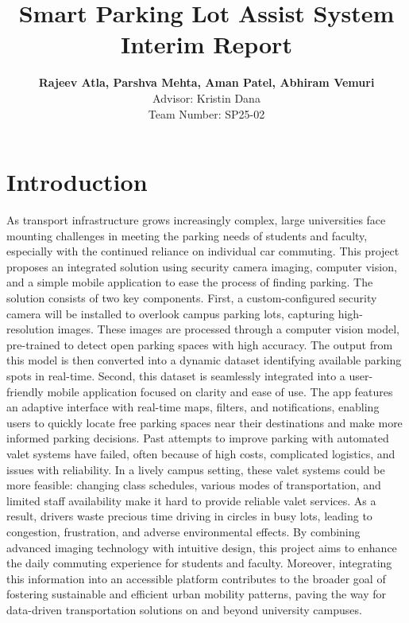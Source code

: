 \documentclass[conference]{IEEEtran}
\begin{document}
\title{Smart Parking Lot Assist System\\
{\footnotesize \textbf{Interim Report}}
}

\author{
\textbf{Rajeev Atla, Parshva Mehta, Aman Patel, Abhiram Vemuri} \\
Advisor: Kristin Dana\\
Team Number: SP25-02 
}

\maketitle

\section{Introduction}
As transport infrastructure grows increasingly complex, 
large universities face mounting challenges in meeting the parking needs of students and faculty, 
especially with the continued reliance on individual car commuting. 
This project proposes an integrated solution using security camera imaging, 
computer vision, 
and a simple mobile application to ease the process of finding parking. 
The solution consists of two key components. 
First, 
a custom-configured security camera will be installed to overlook campus parking lots,
capturing high-resolution images. 
These images are processed through a computer vision model, 
pre-trained to detect open parking spaces with high accuracy. 
The output from this model is then converted into a dynamic dataset identifying available parking spots in real-time. 
Second, 
this dataset is seamlessly integrated into a user-friendly mobile application focused on clarity and ease of use. 
The app features an adaptive interface with real-time maps, 
filters, 
and notifications, 
enabling users to quickly locate free parking spaces near their destinations and make more informed parking decisions. 
Past attempts to improve parking with automated valet systems have failed, 
often because of high costs, 
complicated logistics, 
and issues with reliability. 
In a lively campus setting, 
these valet systems could be more feasible: 
changing class schedules, 
various modes of transportation, 
and limited staff availability make it hard to provide reliable valet services. 
As a result, 
drivers waste precious time driving in circles in busy lots, 
leading to congestion, 
frustration, 
and adverse environmental effects. 
By combining advanced imaging technology with intuitive design, 
this project aims to enhance the daily commuting experience for students and faculty. 
Moreover, 
integrating this information into an accessible platform contributes to the broader goal of fostering sustainable and efficient urban mobility patterns, 
paving the way for data-driven transportation solutions on and beyond university campuses.
\end{document}
